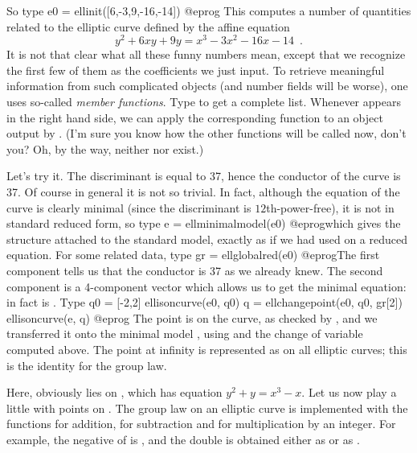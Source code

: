 So type
\bprog
  e0 = ellinit([6,-3,9,-16,-14])
@eprog
This computes a number of quantities related to the elliptic curve defined by
the affine equation
%
$$ y^2+6xy+9y = x^3-3x^2-16x-14\enspace. $$
%
It is not that clear what all these funny numbers mean, except that we
recognize the first few of them as the coefficients we just input. To
retrieve meaningful information from such complicated objects (and number
fields will be worse), one uses so-called \emph{member functions}.
Type  to get a complete list. Whenever  appears
in the right hand side, we can apply the corresponding function to an object
output by . (I'm sure you know how the other  functions
will be called now, don't you? Oh, by the way, neither  nor
 exist.)

  Let's try it. The discriminant  is equal to 37, hence
the conductor of the curve is 37. Of course in general it is not so
trivial. In fact, although the equation of the curve is clearly
minimal (since the discriminant is $12$th-power-free), it is not in
standard reduced form, so type
\bprog
  e = ellminimalmodel(e0)
@eprog\noindent which
gives the  structure attached to the standard model,
exactly as if we had used  on a reduced equation. For
some related data, type
\bprog
  gr = ellglobalred(e0)
@eprog\noindent The first
component  tells us that the conductor is 37 as we already
knew.  The second component is a 4-component vector which allows us to
get the minimal equation: in fact  is .
Type
\bprog
  q0 = [-2,2]
  ellisoncurve(e0, q0)
  q = ellchangepoint(e0, q0, gr[2])
  ellisoncurve(e, q)
@eprog\noindent
The point  is on the curve, as checked by , and we
transferred it onto the minimal model , using  and
the change of variable computed above. The point at infinity is represented
as \kbd{[0]} on all elliptic curves; this is the identity for the group law.

Here,  obviously lies on , which has equation
$y^2+y = x^3-x$.  Let us now play a little with points on .
The group law on an elliptic curve is implemented with the functions
 for addition,  for subtraction and
 for multiplication by an integer.  For
example, the negative of  is , and the
double is obtained either as  or as
.

